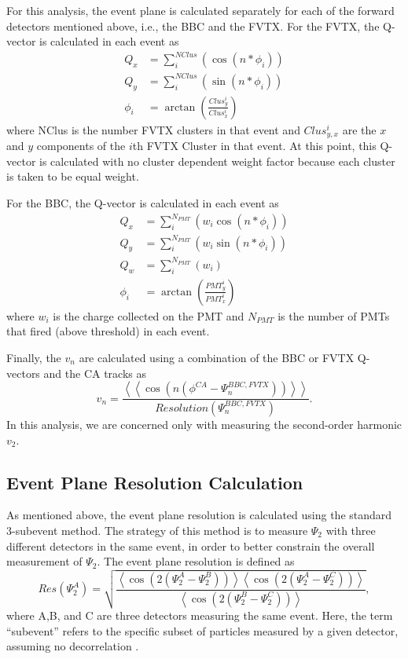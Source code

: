 For this analysis, the event plane is calculated separately for each of the forward detectors mentioned above, i.e., the BBC and the FVTX.
For the FVTX, the Q-vector is calculated in each event as
\begin{align}
Q_x &= \sum^{NClus}_i( \cos(n * \phi_i)) \\
Q_y &= \sum^{NClus}_i( \sin(n * \phi_i)) \\
\phi_i &= \arctan(\frac{Clus_{y}^i}{Clus_{x}^i})
\end{align}
where NClus is the number FVTX clusters in that event and $Clus_{y,x}^i$ are the $x$ and $y$ components of the $i$th FVTX Cluster in that event. At this point, this Q-vector is calculated with no cluster dependent weight factor because each cluster is taken to be equal weight.

For the BBC, the Q-vector is calculated in each event as
\begin{align}
Q_x &= \sum^{N_{PMT}}_i( w_i \cos(n * \phi_i)) \\
Q_y &= \sum^{N_{PMT}}_i( w_i \sin(n * \phi_i)) \\
Q_w &= \sum^{N_{PMT}}_i( w_i ) \\
\phi_i &= \arctan(\frac{PMT_{y}^i}{PMT_{x}^i}) 
\label{eqn:bbc_ep_eqns}
\end{align}
where $w_i$ is the charge collected on the PMT and $N_{PMT}$ is the number of PMTs that fired (above threshold) in each event.

Finally, the $v_n$ are calculated using a combination of the BBC or FVTX Q-vectors and the CA tracks as
\begin{equation}
v_n = \frac{\left<\left<\cos(n(\phi^{CA} - \Psi^{BBC,FVTX}_n))\right>\right>}{Resolution(\Psi^{BBC,FVTX}_n)}.
\end{equation}
In this analysis, we are concerned only with measuring the second-order harmonic $v_2$.

\subsection{Event Plane Resolution Calculation}
As mentioned above, the event plane resolution is calculated using the standard 3-subevent method\cite{PhysRevC.58.1671}. The strategy of this method is to measure $\Psi_2$ with three
different detectors in the same event, in order to better constrain the overall measurement of $\Psi_2$. The event plane resolution is defined as
\begin{equation}
Res(\Psi_2^A) = \sqrt{\frac{\left<\cos(2(\Psi_2^A - \Psi_2^B))\right>\left<\cos(2(\Psi_2^A - \Psi_2^C))\right>}{\left<\cos(2(\Psi_2^B - \Psi_2^C))\right>}},
\label{eqn:res}
\end{equation}
where A,B, and C are three detectors measuring the same event. Here, the term ``subevent'' refers to the specific subset of particles measured by a given detector, assuming no decorrelation \cite{PhysRevC.58.1671}.

